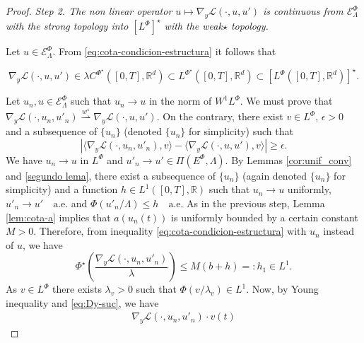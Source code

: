 \documentclass[twoside]{article}
\theoremstyle{remark}
\newcommand{\lphi}{L^{\Phi}}
\newcommand{\lpsi}{L^{\Phi^{\star}}}
\newcommand{\ephi}{E^{\Phi}}
\newcommand{\wphi}{W^{1}\lphi}
\newcommand{\domi}{\mathcal{E}^{\Phi}}
\newcommand{\rr}{\mathbb{R}}
\renewcommand{\leq}{\leqslant}
\renewcommand{\geq}{\geqslant}
\begin{document}
\begin{proof}
\noindent\emph{Step 2. The non linear operator   $u
 \mapsto  \nabla_y\mathcal{L}(\cdot,u,u')$ is continuous from $\domi_{\Lambda}$ with the strong topology  
into $\left[\lphi\right]^{\star}$  with the weak$\star$ topology.}

 Let $u\in \domi_{\Lambda}$.  From  \eqref{eq:cota-condicion-estructura} it follows that 

\begin{equation}\label{eq:DyLpsi-clase}
\nabla_y\mathcal{L}(\cdot,u,u')\in \lambda C^{\Phi^{\star}}\left([0,T],\rr^d\right)\subset\lpsi\left([0,T],\rr^d\right)\subset\left[\lphi\left([0,T],\rr^d\right)\right]^{\star}.
\end{equation}






Let $u_n,u\in \domi_{\Lambda}$ such that $u_n\to u$ in the norm of $\wphi$. 
We must prove that  $\nabla_y\mathcal{L}(\cdot,u_n,u'_n)\overset{w^\star}{\rightharpoonup} 
\nabla_y\mathcal{L}(\cdot,u,u')$. 
On the contrary, there exist $v\in\lphi$, $\epsilon>0$ and a subsequence of $\{u_n\}$ (denoted  $\{u_n\}$ for simplicity)  such that
\begin{equation}\label{cota_eps}
 \left| \langle \nabla_y\mathcal{L}(\cdot,u_n,u'_n),v \rangle - 
\langle  \nabla_y\mathcal{L}(\cdot,u,u'),v \rangle\right|\geq \epsilon.
\end{equation}
We have $u_n\rightarrow u$ in $\lphi$ and
$u'_n\rightarrow u'\in\Pi(\ephi,\Lambda)$.
 By Lemmas \ref{cor:unif_conv}  and \ref{segundo lema}, there exist a subsequence of $\{u_n\}$ (again denoted  $\{u_n\}$ for simplicity) 
and a function $h\in L^1([0,T],\rr)$ such that 
$u_n\rightarrow u$ uniformly, $u'_n\rightarrow u' \quad\text{a.e.}$ and $\Phi(u'_n/\Lambda)\leq h\quad\text{a.e.}$ 
As in the previous step,
Lemma \ref{lem:cota-a} implies that $a(u_n(t))$ is uniformly bounded by a certain constant $M>0$. 
Therefore,   from inequality  \eqref{eq:cota-condicion-estructura} with $u_n$ instead of $u$, we have 
\begin{equation}\label{eq:Dy-suc}
  \Phi^{\star}\left(\frac{\nabla_y\mathcal{L}(\cdot,u_n,u'_n)}{\lambda}\right)   
	\leq M (b+h)=:h_1\in L^1.
\end{equation}
As $v \in \lphi$ there exists $\lambda_v>0$ such that $\Phi(v/\lambda_v)\in L^1$. 
Now, by Young inequality and \eqref{eq:Dy-suc}, we have
\begin{equation}\label{eq:Dy_lambda-Psi}
\begin{split}
\nabla_y\mathcal{L}(\cdot,u_{n},u'_{n})\cdot v(t)

\end{split}
\end{equation}
\end{proof}
\end{document}
